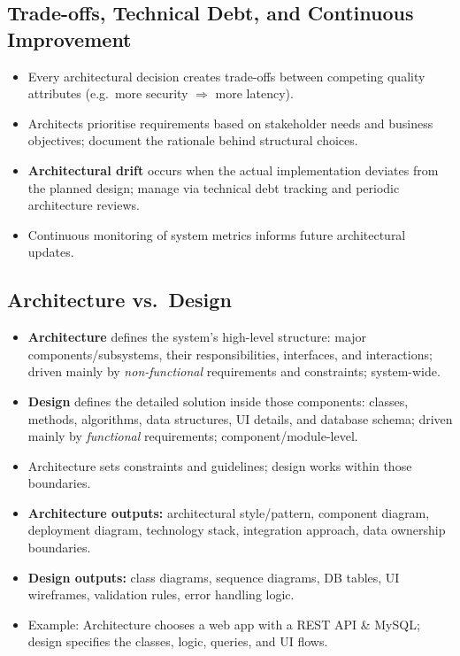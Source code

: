 \documentclass[hidelinks]{article}
\begin{document}
\subsection{Trade-offs, Technical Debt, and Continuous Improvement}
\begin{itemize}
  \item Every architectural decision creates trade-offs between competing quality attributes (e.g.\ more
        security $\Rightarrow$ more latency).
  \item Architects prioritise requirements based on stakeholder needs and business objectives; document
        the rationale behind structural choices.
  \item \textbf{Architectural drift} occurs when the actual implementation deviates from the planned
        design; manage via technical debt tracking and periodic architecture reviews.
  \item Continuous monitoring of system metrics informs future architectural updates.
\end{itemize}

\subsection{Architecture vs.\ Design}
\begin{itemize}
  \item \textbf{Architecture} defines the system's high-level structure: major components/subsystems,
        their responsibilities, interfaces, and interactions; driven mainly by \emph{non-functional}
        requirements and constraints; system-wide.
  \item \textbf{Design} defines the detailed solution inside those components: classes, methods,
        algorithms, data structures, UI details, and database schema; driven mainly by
        \emph{functional} requirements; component/module-level.
  \item Architecture sets constraints and guidelines; design works within those boundaries.
  \item \textbf{Architecture outputs:} architectural style/pattern, component diagram, deployment
        diagram, technology stack, integration approach, data ownership boundaries.
  \item \textbf{Design outputs:} class diagrams, sequence diagrams, DB tables, UI wireframes,
        validation rules, error handling logic.
  \item Example: Architecture chooses a web app with a REST API \& MySQL; design specifies the
        classes, logic, queries, and UI flows.
\end{itemize}
\end{document}
